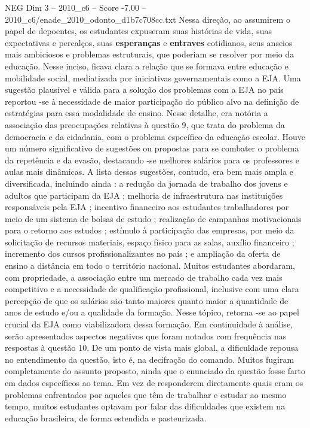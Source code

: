 \begin{textsample}{NEG Dim 3 – 2010\_c6 – Score -7.00 – 2010\_c6/enade\_2010\_odonto\_d1b7c708cc.txt}
Nessa direção, ao assumirem o papel de depoentes, os estudantes expuseram suas histórias de vida, suas expectativas e percalços, suas \textbf{esperanças} e \textbf{entraves} cotidianos, seus anseios mais ambiciosos e problemas estruturais, que poderiam se resolver por meio da educação.
Nesse inciso, ficava clara a relação que se formava entre educação e mobilidade social, mediatizada por iniciativas governamentais como a EJA.
Uma sugestão plausível e válida para a solução dos problemas com a EJA no país reportou -se à necessidade de maior participação do público alvo na definição de estratégias para essa modalidade de ensino.
Nesse detalhe, era notória a associação das preocupações relativas à questão 9, que trata do problema da democracia e da cidadania, com o problema específico da educação escolar.
Houve um número significativo de sugestões ou propostas para se combater o problema da repetência e da evasão, destacando -se melhores salários para os professores e aulas mais dinâmicas.
A lista dessas sugestões, contudo, era bem mais ampla e diversificada, incluindo ainda : a redução da jornada de trabalho dos jovens e adultos que participam da EJA ; melhoria de infraestrutura nas instituições responsáveis pela EJA ; incentivo financeiro aos estudantes trabalhadores por meio de um sistema de bolsas de estudo ; realização de campanhas motivacionais para o retorno aos estudos ; estímulo à participação das empresas, por meio da solicitação de recursos materiais, espaço físico para as salas, auxílio financeiro ; incremento dos cursos profissionalizantes no país ; e ampliação da oferta de ensino a distância em todo o território nacional.
Muitos estudantes abordaram, com propriedade, a associação entre um mercado de trabalho cada vez mais competitivo e a necessidade de qualificação profissional, inclusive com uma clara percepção de que os salários são tanto maiores quanto maior a quantidade de anos de estudo e/ou a qualidade da formação.
Nesse tópico, retorna -se ao papel crucial da EJA como viabilizadora dessa formação.
Em continuidade à análise, serão apresentados aspectos negativos que foram notados com frequência nas respostas à questão 10.
De um ponto de vista mais global, a dificuldade repousa no entendimento da questão, isto é, na decifração do comando.
Muitos fugiram completamente do assunto proposto, ainda que o enunciado da questão fosse farto em dados específicos ao tema.
Em vez de responderem diretamente quais eram os problemas enfrentados por aqueles que têm de trabalhar e estudar ao mesmo tempo, muitos estudantes optavam por falar das dificuldades que existem na educação brasileira, de forma estendida e pasteurizada.

\end{textsample}
